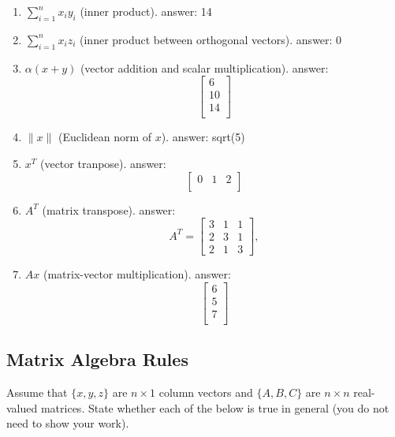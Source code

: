 \documentclass{article}
\def\blu#1{{\color{blu}#1}}
\def\norm#1{\|#1\|}
\def\enum#1{\begin{enumerate}#1\end{enumerate}}
\begin{document}
\enum{
\item $\sum_{i=1}^n x_iy_i$ (inner product).  
\newline
answer: 14
\item $\sum_{i=1}^n x_iz_i$ (inner product between orthogonal vectors).
\newline
answer: 0
\item $\alpha(x+y)$ (vector addition and scalar multiplication).
\newline
answer:\[
\left[\begin{array}{c}
6\\
10\\
14\\
\end{array}\right]
\]
\item $\norm{x}$ (Euclidean norm of $x$).
\newline
answer: sqrt(5)
\item $x^T$ (vector tranpose).
\newline
answer:\[
\left[\begin{array}{ccc}
0&1&2\\
\end{array}\right]
\]
\item $A^T$ (matrix transpose).
\newline
answer: \[
A^T = \left[\begin{array}{ccc}
3 & 1 & 1\\
2 & 3 & 1\\
2 & 1 & 3
\end{array}\right],
\]
\item $Ax$ (matrix-vector multiplication).
\newline
answer:\[
\left[\begin{array}{c}
6\\
5\\
7\\
\end{array}\right]
\]
} 

\subsection{Matrix Algebra Rules}

Assume that $\{x,y,z\}$ are $n \times 1$ column vectors and $\{A,B,C\}$ are $n \times n$ real-valued matrices. \blu{State whether each of the below is true in general} (you do not need to show your work).
\end{document}
